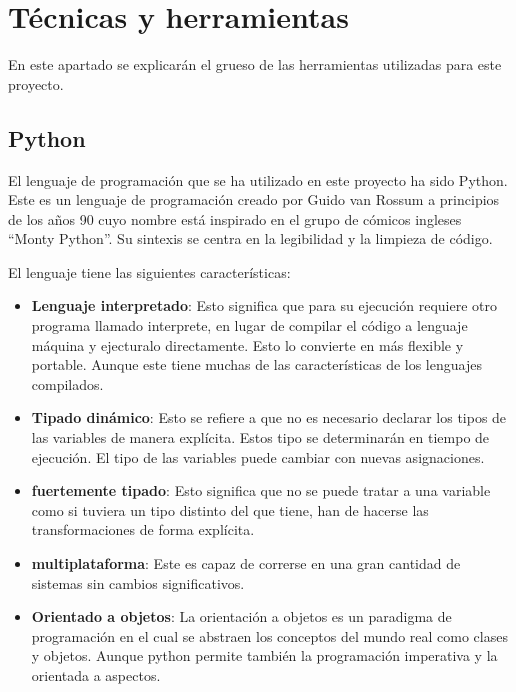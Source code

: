 \chapter{Técnicas y herramientas}

En este apartado se explicarán el grueso de las herramientas utilizadas para este proyecto.

\section{Python}
El lenguaje de programación que se ha utilizado en este proyecto ha sido Python. Este es un lenguaje de programación creado por Guido van Rossum a principios de los años 90 cuyo nombre está inspirado en el grupo de cómicos ingleses “Monty Python”\cite{gonzalez2011python}. Su sintexis se centra en la legibilidad y la limpieza de código.

El lenguaje tiene las siguientes características:
\begin{itemize}
	\item\textbf{Lenguaje interpretado}: Esto significa que para su ejecución requiere otro programa llamado interprete, en lugar de compilar el código a lenguaje máquina y ejecturalo directamente.
	Esto lo convierte en más flexible y portable. Aunque este tiene muchas de las características de los lenguajes compilados.
	
	\item\textbf{Tipado dinámico}: Esto se refiere a que no es necesario declarar los tipos de las variables de manera explícita. Estos tipo se determinarán en tiempo de ejecución. El tipo de las variables puede cambiar con nuevas asignaciones.
	
	\item\textbf{fuertemente tipado}: Esto significa que  no se puede tratar a una variable como si tuviera un tipo distinto del que tiene, han de hacerse las transformaciones de forma explícita.
	
	\item\textbf{multiplataforma}: Este es capaz de correrse en una gran cantidad de sistemas sin cambios significativos.
	
	\item\textbf{Orientado a objetos}: La orientación a objetos es un paradigma de programación en el cual se abstraen los conceptos del mundo real como clases y objetos. Aunque python permite también la programación imperativa y la orientada a aspectos.
	
\end{itemize}

